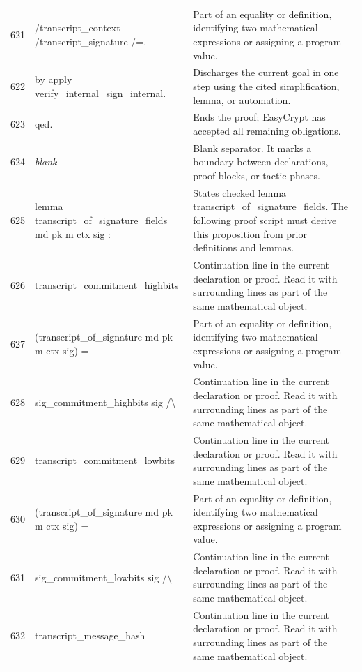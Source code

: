 \documentclass[10pt]{article}
\begin{document}
\begin{longtable}{r L{0.53\textwidth} L{0.37\textwidth}}
621 & {\ttfamily\scriptsize         /transcript\_context /transcript\_signature /=.} & Part of an equality or definition, identifying two mathematical expressions or assigning a program value. \\
622 & {\ttfamily\scriptsize by apply verify\_internal\_sign\_internal.} & Discharges the current goal in one step using the cited simplification, lemma, or automation. \\
623 & {\ttfamily\scriptsize qed.} & Ends the proof; EasyCrypt has accepted all remaining obligations. \\
624 & {\ttfamily\scriptsize \emph{blank}} & Blank separator.  It marks a boundary between declarations, proof blocks, or tactic phases. \\
625 & {\ttfamily\scriptsize lemma transcript\_of\_signature\_fields md pk m ctx sig :} & States checked lemma transcript\_of\_signature\_fields.  The following proof script must derive this proposition from prior definitions and lemmas. \\
626 & {\ttfamily\scriptsize   transcript\_commitment\_highbits} & Continuation line in the current declaration or proof.  Read it with surrounding lines as part of the same mathematical object. \\
627 & {\ttfamily\scriptsize     (transcript\_of\_signature md pk m ctx sig) =} & Part of an equality or definition, identifying two mathematical expressions or assigning a program value. \\
628 & {\ttfamily\scriptsize     sig\_commitment\_highbits sig /\textbackslash{}} & Continuation line in the current declaration or proof.  Read it with surrounding lines as part of the same mathematical object. \\
629 & {\ttfamily\scriptsize   transcript\_commitment\_lowbits} & Continuation line in the current declaration or proof.  Read it with surrounding lines as part of the same mathematical object. \\
630 & {\ttfamily\scriptsize     (transcript\_of\_signature md pk m ctx sig) =} & Part of an equality or definition, identifying two mathematical expressions or assigning a program value. \\
631 & {\ttfamily\scriptsize     sig\_commitment\_lowbits sig /\textbackslash{}} & Continuation line in the current declaration or proof.  Read it with surrounding lines as part of the same mathematical object. \\
632 & {\ttfamily\scriptsize   transcript\_message\_hash} & Continuation line in the current declaration or proof.  Read it with surrounding lines as part of the same mathematical object. \\

\end{longtable}
\end{document}

